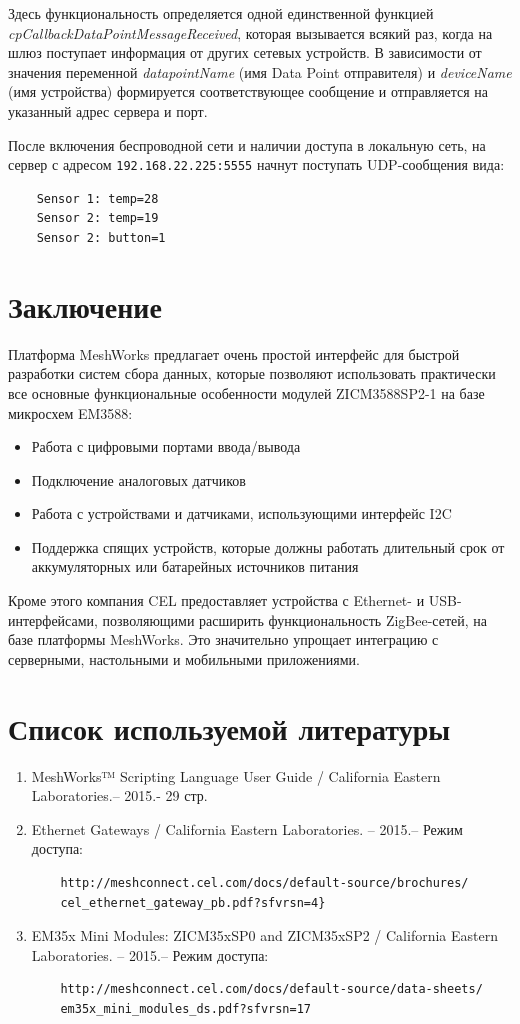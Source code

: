 \documentclass[11pt]{article}
\begin{document}
Здесь функциональность определяется одной единственной функцией 
\emph{cpCallbackDataPointMessageReceived}, которая вызывается всякий раз, когда 
на шлюз поступает информация от других сетевых устройств. В зависимости от значения
переменной \emph{datapointName} (имя Data Point отправителя) и \emph{deviceName} (имя 
устройства) формируется соответствующее сообщение и отправляется на указанный адрес
сервера и порт.

После включения беспроводной сети и наличии доступа в локальную сеть, на сервер с адресом
\texttt{192.168.22.225:5555} начнут поступать UDP-сообщения вида:
\begin{verbatim}
    Sensor 1: temp=28
    Sensor 2: temp=19
    Sensor 2: button=1
\end{verbatim}
\newpage %
\section*{Заключение}
Платформа MeshWorks предлагает очень простой интерфейс для быстрой разработки систем
сбора данных, которые позволяют использовать практически все основные функциональные
особенности модулей ZICM3588SP2-1 на базе микросхем EM3588:
\begin{itemize}
 \item Работа с цифровыми портами ввода/вывода
 \item Подключение аналоговых датчиков
 \item Работа с устройствами и датчиками, использующими интерфейс I2C
 \item Поддержка спящих устройств, которые должны работать длительный срок от
 аккумуляторных или батарейных источников питания
\end{itemize}
Кроме этого компания CEL предоставляет устройства с Ethernet- и USB-интерфейсами, 
позволяющими расширить функциональность ZigBee-сетей, на базе платформы MeshWorks.
Это значительно упрощает интеграцию с серверными, настольными и мобильными приложениями.

\section*{Список используемой литературы}

\begin{enumerate}
    \item MeshWorks™ Scripting Language User Guide / California Eastern Laboratories.--
    2015.- 29 стр.
    \item Ethernet Gateways / California Eastern Laboratories. -- 2015.– Режим доступа:
    \begin{verbatim}
    http://meshconnect.cel.com/docs/default-source/brochures/
    cel_ethernet_gateway_pb.pdf?sfvrsn=4}
    \end{verbatim}
    \item EM35x Mini Modules: ZICM35xSP0 and ZICM35xSP2 / California Eastern Laboratories. -- 2015.– Режим доступа:
    \begin{verbatim}
    http://meshconnect.cel.com/docs/default-source/data-sheets/
    em35x_mini_modules_ds.pdf?sfvrsn=17
    \end{verbatim}
\end{enumerate}
\end{document}
